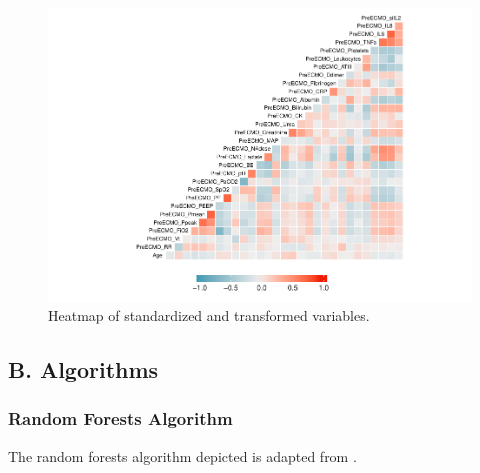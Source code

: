 \documentclass[12pt,]{article}
\newcommand{\appendixB}{ \setcounter{table}{0} \renewcommand{\thetable}{B\arabic{table}} \setcounter{figure}{0} \renewcommand{\thefigure}{B\arabic{figure}} }
\begin{document}
\begin{figure}[H]

{\centering \includegraphics[width=1\linewidth]{figure/graphics-unnamed-chunk-11-1} 

}

\caption{\label{fig:heatmap-standardized}Heatmap of standardized and transformed variables.}\label{fig:unnamed-chunk-11}
\end{figure}

\newpage

\subsection*{B. Algorithms}\label{b.-algorithms}

\appendixB

\subsubsection{Random Forests Algorithm}\label{random-forests-algorithm}

The random forests algorithm depicted is adapted from
\autocite{hastie_elements_2009}.
\end{document}
